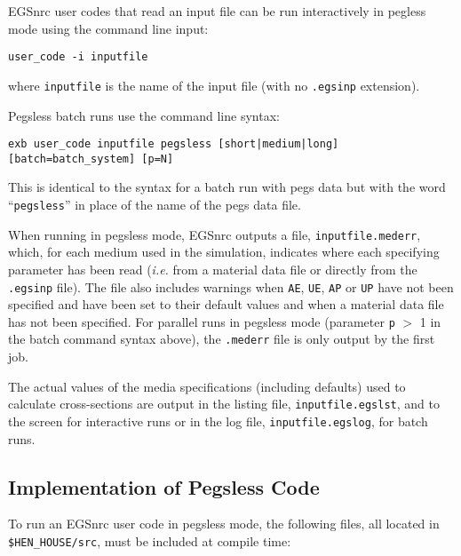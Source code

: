 EGSnrc user codes that read an input file can be run interactively in pegless mode using the command line input:
\begin{verbatim}
user_code -i inputfile
\end{verbatim}
where {\tt inputfile} is the name of the input file (with no
{\tt .egsinp} extension).

Pegsless batch runs use the command line syntax:
\begin{verbatim}
exb user_code inputfile pegsless [short|medium|long] [batch=batch_system] [p=N]
\end{verbatim}
This is identical to the syntax for a batch run with pegs data but
with the word ``{\tt pegsless}'' in place of the name of the pegs data file.

When running in pegsless mode, EGSnrc outputs a file, {\tt inputfile.mederr}, which, for each medium used
in the simulation, indicates where each specifying parameter has been read ({\it i.e.} from a material data
file or directly from the {\tt .egsinp} file).  The file also includes warnings when {\tt AE}, {\tt UE},
{\tt AP} or {\tt UP} have not been specified and have been set to their default values and when a material
data file has not been specified.  For parallel runs in pegsless mode (parameter {\tt p} $>$ 1 in the batch
command syntax above), the {\tt .mederr} file is only output by the first job.

The actual values of the media specifications (including defaults) used to calculate cross-sections are
output in the listing file, {\tt inputfile.egslst}, and to the screen for interactive runs or in the
log file, {\tt inputfile.egslog}, for batch runs.

\subsection{Implementation of Pegsless Code}

To run an EGSnrc user code in pegsless mode, the following files, all located in
{\tt \$HEN\_HOUSE/src}, must be included at compile time:


